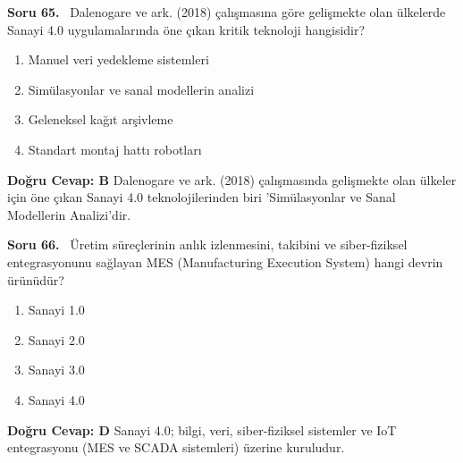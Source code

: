 \documentclass[11pt,a4paper,openany]{book}
\begin{document}
\needspace{5cm}
\vspace{8pt}
\noindent\textbf{\large\sffamily Soru 65.} \ Dalenogare ve ark. (2018) çalışmasına göre gelişmekte olan ülkelerde Sanayi 4.0 uygulamalarında öne çıkan kritik teknoloji hangisidir?
\begin{enumerate}[label=\Alph*), leftmargin=25pt, topsep=4pt, itemsep=2pt]
    \item Manuel veri yedekleme sistemleri
    \item Simülasyonlar ve sanal modellerin analizi
    \item Geleneksel kağıt arşivleme
    \item Standart montaj hattı robotları
\end{enumerate}
\vspace{4pt}
\begin{tcolorbox}[title=Cevap ve Açıklama, colback=gray!3!white, colframe=primarycolor!90!black, arc=2mm, fonttitle=\bfseries\sffamily, top=6pt, bottom=6pt]
    \textbf{Doğru Cevap: B}
    \vspace{2pt}
    Dalenogare ve ark. (2018) çalışmasında gelişmekte olan ülkeler için öne çıkan Sanayi 4.0 teknolojilerinden biri 'Simülasyonlar ve Sanal Modellerin Analizi'dir.
\end{tcolorbox}
\vspace{10pt}

\needspace{5cm}
\vspace{8pt}
\noindent\textbf{\large\sffamily Soru 66.} \ Üretim süreçlerinin anlık izlenmesini, takibini ve siber-fiziksel entegrasyonunu sağlayan MES (Manufacturing Execution System) hangi devrin ürünüdür?
\begin{enumerate}[label=\Alph*), leftmargin=25pt, topsep=4pt, itemsep=2pt]
    \item Sanayi 1.0
    \item Sanayi 2.0
    \item Sanayi 3.0
    \item Sanayi 4.0
\end{enumerate}
\vspace{4pt}
\begin{tcolorbox}[title=Cevap ve Açıklama, colback=gray!3!white, colframe=primarycolor!90!black, arc=2mm, fonttitle=\bfseries\sffamily, top=6pt, bottom=6pt]
    \textbf{Doğru Cevap: D}
    \vspace{2pt}
    Sanayi 4.0; bilgi, veri, siber-fiziksel sistemler ve IoT entegrasyonu (MES ve SCADA sistemleri) üzerine kuruludur.
\end{tcolorbox}
\vspace{10pt}
\end{document}
